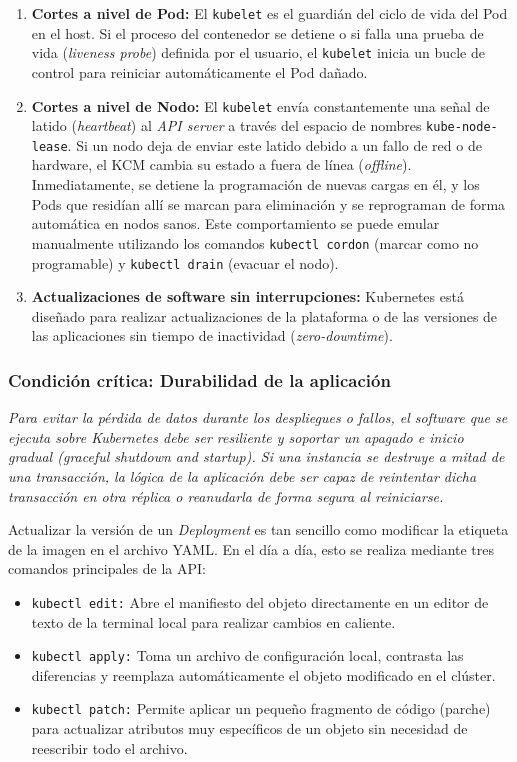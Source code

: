 \begin{enumerate}
    \item \textbf{Cortes a nivel de Pod:} El \texttt{kubelet} es el guardián del ciclo de vida del Pod en el host. Si el proceso del contenedor se detiene o si falla una prueba de vida (\textit{liveness probe}) definida por el usuario, el \texttt{kubelet} inicia un bucle de control para reiniciar automáticamente el Pod dañado.
    \item \textbf{Cortes a nivel de Nodo:} El \texttt{kubelet} envía constantemente una señal de latido (\textit{heartbeat}) al \textit{API server} a través del espacio de nombres \texttt{kube-node-lease}. Si un nodo deja de enviar este latido debido a un fallo de red o de hardware, el KCM cambia su estado a fuera de línea (\textit{offline}). Inmediatamente, se detiene la programación de nuevas cargas en él, y los Pods que residían allí se marcan para eliminación y se reprograman de forma automática en nodos sanos. Este comportamiento se puede emular manualmente utilizando los comandos \texttt{kubectl cordon} (marcar como no programable) y \texttt{kubectl drain} (evacuar el nodo).
    \item \textbf{Actualizaciones de software sin interrupciones:} Kubernetes está diseñado para realizar actualizaciones de la plataforma o de las versiones de las aplicaciones sin tiempo de inactividad (\textit{zero-downtime}). 
\end{enumerate}

\subsubsection*{Condición crítica: Durabilidad de la aplicación}
\textit{Para evitar la pérdida de datos durante los despliegues o fallos, el software que se ejecuta sobre Kubernetes debe ser resiliente y soportar un apagado e inicio gradual (\textit{graceful shutdown and startup}). Si una instancia se destruye a mitad de una transacción, la lógica de la aplicación debe ser capaz de reintentar dicha transacción en otra réplica o reanudarla de forma segura al reiniciarse.}

Actualizar la versión de un \textit{Deployment} es tan sencillo como modificar la etiqueta de la imagen en el archivo YAML. En el día a día, esto se realiza mediante tres comandos principales de la API:
\begin{itemize}
    \item \texttt{kubectl edit:} Abre el manifiesto del objeto directamente en un editor de texto de la terminal local para realizar cambios en caliente.
    \item \texttt{kubectl apply:} Toma un archivo de configuración local, contrasta las diferencias y reemplaza automáticamente el objeto modificado en el clúster.
    \item \texttt{kubectl patch:} Permite aplicar un pequeño fragmento de código (parche) para actualizar atributos muy específicos de un objeto sin necesidad de reescribir todo el archivo.
\end{itemize}


